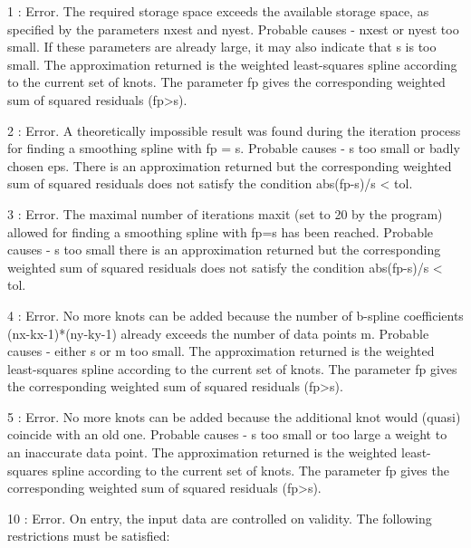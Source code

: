 \documentclass[11pt,twoside,nolof]{starlink}
\begin{document}
\begin{terminalv}
           1 : Error. The required storage space exceeds the available
               storage space, as specified by the parameters nxest and
               nyest. Probable causes - nxest or nyest too small. If these
               parameters are already large, it may also indicate that s is
               too small. The approximation returned is the weighted
               least-squares spline according to the current set of knots.
               The parameter fp gives the corresponding weighted sum of
               squared residuals (fp>s).

           2 : Error. A theoretically impossible result was found during
               the iteration process for finding a smoothing spline with
               fp = s. Probable causes - s too small or badly chosen eps.
               There is an approximation returned but the corresponding
               weighted sum of squared residuals does not satisfy the
               condition abs(fp-s)/s < tol.

           3 : Error. The maximal number of iterations maxit (set to 20
               by the program) allowed for finding a smoothing spline
               with fp=s has been reached. Probable causes - s too small
               there is an approximation returned but the corresponding
               weighted sum of squared residuals does not satisfy the
               condition abs(fp-s)/s < tol.

           4 : Error. No more knots can be added because the number of
               b-spline coefficients (nx-kx-1)*(ny-ky-1) already exceeds
               the number of data points m. Probable causes - either s or
               m too small. The approximation returned is the weighted
               least-squares spline according to the current set of knots.
               The parameter fp gives the corresponding weighted sum of
               squared residuals (fp>s).

           5 : Error. No more knots can be added because the additional
               knot would (quasi) coincide with an old one. Probable
               causes - s too small or too large a weight to an inaccurate
               data point. The approximation returned is the weighted
               least-squares spline according to the current set of knots.
               The parameter fp gives the corresponding weighted sum of
               squared residuals (fp>s).

          10 : Error. On entry, the input data are controlled on validity.
               The following restrictions must be satisfied:


\end{terminalv}
\end{document}
